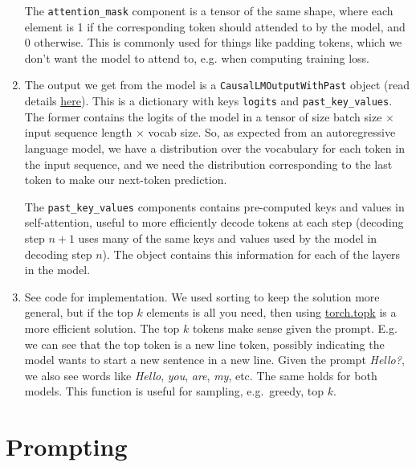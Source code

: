 \documentclass[11pt,a4paper]{article}
\begin{document}
\begin{enumerate}[label=(\alph*)]
          The \texttt{attention\_mask} component is a tensor of the same shape,
          where each element is 1 if the corresponding token should attended to
          by the model, and 0 otherwise.
          This is commonly used for things like padding tokens, which we don't
          want the model to attend to, e.g. when computing training loss.
    \item The output we get from the model is a
          \texttt{CausalLMOutputWithPast} object (read details
          \href{https://huggingface.co/docs/transformers/en/main_classes/output#transformers.modeling_outputs.CausalLMOutputWithPast}{here}).
          This is a dictionary with keys \texttt{logits} and
          \texttt{past\_key\_values}.
          The former contains the logits of the model in a tensor of size
          batch size $\times$ input sequence length $\times$ vocab size.
          So, as expected from an autoregressive language model, we have a
          distribution over the vocabulary for each token in the input sequence,
          and we need the distribution corresponding to the last token to make
          our next-token prediction.

          The \texttt{past\_key\_values} components contains pre-computed keys
          and values in self-attention, useful to more efficiently decode tokens
          at each step (decoding step $n + 1$ uses many of the same keys and
          values used by the model in decoding step $n$). The object contains
          this information for each of the layers in the model.
    \item See code for implementation. We used sorting to keep the solution more
          general, but if the top $k$ elements is all you need, then using
          \href{https://docs.pytorch.org/docs/stable/generated/torch.topk.html}{torch.topk}
          is a more efficient solution.
          The top $k$ tokens make sense given the prompt.
          E.g. we can see that the top token is a new line token, possibly
          indicating the model wants to start a new sentence in a new line.
          Given the prompt \emph{Hello?}, we also see words like \emph{Hello},
          \emph{you}, \emph{are}, \emph{my}, etc.
          The same holds for both models.
          This function is useful for sampling, e.g.\ greedy, top $k$.
\end{enumerate}

\section{Prompting}
\end{document}
